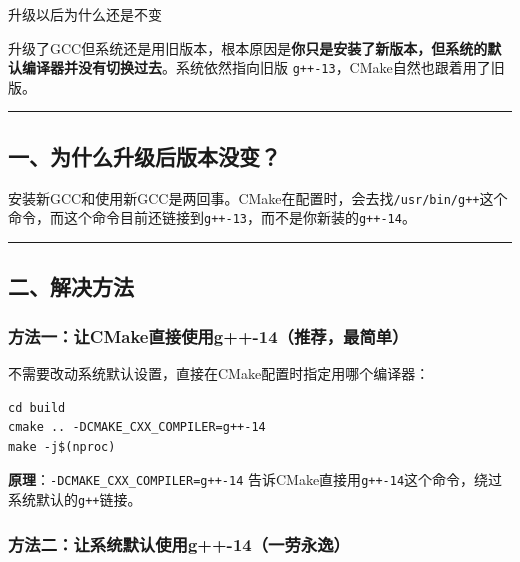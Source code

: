 \documentclass[11pt, a4paper]{article}
\begin{document}
\begin{userbox}
升级以后为什么还是不变
\end{userbox}

\begin{aibox}
升级了GCC但系统还是用旧版本，根本原因是\textbf{你只是安装了新版本，但系统的默认编译器并没有切换过去}。系统依然指向旧版 \texttt{g++-13}，CMake自然也跟着用了旧版。

\begin{center}\rule{\textwidth}{0.4pt}\end{center}

\subsection*{一、为什么升级后版本没变？}

安装新GCC和使用新GCC是两回事。CMake在配置时，会去找\texttt{/usr/bin/g++}这个命令，而这个命令目前还链接到\texttt{g++-13}，而不是你新装的\texttt{g++-14}。

\begin{center}\rule{\textwidth}{0.4pt}\end{center}

\subsection*{二、解决方法}

\subsubsection*{方法一：让CMake直接使用g++-14（推荐，最简单）}

不需要改动系统默认设置，直接在CMake配置时指定用哪个编译器：

\begin{tcolorbox}[colback=white,colframe=gray!50!white,boxrule=0.5pt,arc=2pt,left=5pt,right=5pt,top=5pt,bottom=5pt]
\begin{verbatim}
cd build
cmake .. -DCMAKE_CXX_COMPILER=g++-14
make -j$(nproc)
\end{verbatim}
\end{tcolorbox}

\textbf{原理}：\texttt{-DCMAKE\_CXX\_COMPILER=g++-14} 告诉CMake直接用\texttt{g++-14}这个命令，绕过系统默认的\texttt{g++}链接。

\subsubsection*{方法二：让系统默认使用g++-14（一劳永逸）}


\end{aibox}
\end{document}
